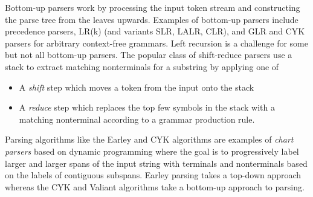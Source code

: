 \documentclass[sigplan,10pt,anonymous,review]{acmart}\settopmatter{printfolios=true,printccs=false,printacmref=false}
\begin{document}
\begin{CCSXML}
Bottom-up parsers work by processing the input token stream and
constructing the parse tree from the leaves upwards.
Examples of bottom-up parsers  include precedence parsers, LR(k) (and variants SLR,
LALR, CLR), and GLR  and CYK parsers for arbitrary context-free
grammars.  Left recursion is a challenge for some but not all bottom-up parsers.
The popular class of shift-reduce parsers use a
stack to extract matching nonterminals for a substring by applying
one of 
\begin{itemize}
\item A \emph{shift} step which moves a token from the input onto the stack
\item A \emph{reduce} step which replaces the top few symbols in the stack
  with a matching nonterminal according to a grammar production rule.  
\end{itemize}

Parsing algorithms like the Earley and CYK algorithms are examples of \emph{chart
parsers} based on dynamic programming where the goal is to
progressively label larger and larger spans of the input string with
terminals and nonterminals based on the labels of contiguous subspans.
Earley parsing takes a top-down approach whereas the CYK and Valiant
algorithms take a bottom-up approach to parsing.


\end{CCSXML}
\end{document}
